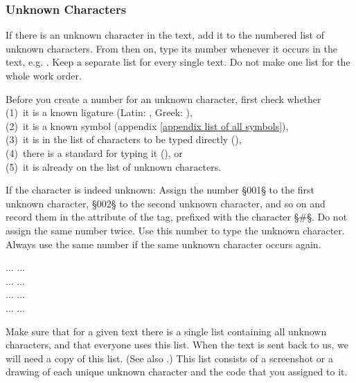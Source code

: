 \subsubsection{Unknown Characters}
\label{section unknown characters}

\begin{mainrule}
If there is an unknown character in the text, add it to the numbered
list of unknown characters. From then on, type its number whenever it
occurs in the text, e.g. . Keep a separate list for every
single text. Do not make one list for the whole work order.
\end{mainrule}

\begin{clarification}
Before you create a number for an unknown character, first check whether \\
(1)~it is a known ligature (Latin: , Greek: ), \\
(2)~it is a known symbol (appendix \ref{appendix list of all symbols}), \\
(3)~it is in the list of characters to be typed directly (), \\
(4)~there is a standard for typing it (), or \\
(5)~it is already on the list of unknown characters.
 \end{clarification}

\begin{clarification}
If the character is indeed unknown: Assign the number §001§ to the first unknown character, §002§ to the second unknown character, and so on and record them in the  attribute of the  tag, prefixed with the character §#§. Do not assign the same number twice. Use this number to type the unknown character. Always use the same number if the same unknown character occurs again.
\end{clarification}

\begin{typeLatin}
 ...  ...  \\
 ...  ...  \\
 ...  ...  \\
 ...  ...
\end{typeLatin}


\begin{note}
Make sure that for a given text there is a single list containing all unknown characters, and that everyone uses this list. When the text is sent back to us, we will need a copy of this list. (See also .) This list consists of a screenshot or a drawing of each unique unknown character and the code that you assigned to it.
\end{note}

